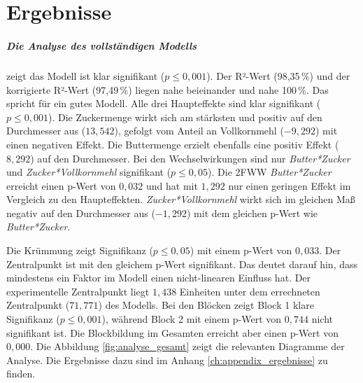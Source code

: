\chapter{Ergebnisse}\label{ch:ergebnisse}

\paragraph{Die Analyse des vollständigen Modells} zeigt das Modell ist klar signifikant ($p \le 0,001$).
Der R²-Wert (98,35\,\%) und der korrigierte R²-Wert (97,49\,\%) liegen nahe beieinander und nahe 100\,\%.
Das spricht für ein gutes Modell. %
Alle drei Haupteffekte sind klar signifikant ($p \le 0,001$).
Die Zuckermenge wirkt sich am stärksten und positiv auf den Durchmesser aus ($13,542$),
gefolgt vom Anteil an Vollkornmehl ($-9,292$) mit einen negativen Effekt.
Die Buttermenge erzielt ebenfalls eine positiv Effekt ($8,292$) auf den Durchmesser.
Bei den Wechselwirkungen sind nur \emph{Butter*Zucker} und \emph{Zucker*Vollkornmehl} signifikant ($p \le 0,05$).
Die 2FWW \emph{Butter*Zucker} erreicht einen p-Wert von $0,032$ und hat mit $1,292$ nur einen geringen Effekt im Vergleich zu den Haupteffekten.
\emph{Zucker*Vollkornmehl} wirkt sich im gleichen Maß negativ auf den Durchmesser aus ($-1,292$) mit dem gleichen p-Wert wie \emph{Butter*Zucker}.

Die Krümmung zeigt Signifikanz ($p \le 0,05$) mit einem p-Wert von $0,033$.
Der Zentralpunkt ist mit den gleichem p-Wert signifikant.
Das deutet darauf hin, dass mindestens ein Faktor im Modell einen nicht-linearen Einfluss hat.
Der experimentelle Zentralpunkt liegt $1,438$ Einheiten unter dem errechneten Zentralpunkt ($71,771$) des Modells.
Bei den Blöcken zeigt Block 1 klare Signifikanz ($p \le 0,001$), während Block 2 mit einem p-Wert von $0,744$ nicht signifikant ist.
Die Blockbildung im Gesamten erreicht aber einen p-Wert von $0,000$.
Die Abbildung \ref{fig:analyse_gesamt} zeigt die relevanten Diagramme der Analyse.
Die Ergebnisse dazu sind im Anhang \ref{ch:appendix_ergebnisse} zu finden.

